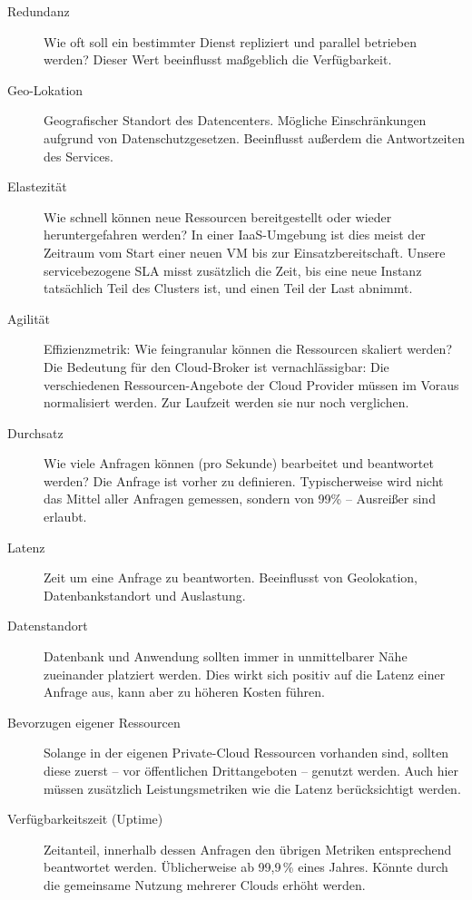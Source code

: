 \begin{description}
	
	\item[Redundanz] Wie oft soll ein bestimmter Dienst repliziert und parallel betrieben werden? Dieser Wert beeinflusst maßgeblich die Verfügbarkeit.	
	
	\item[Geo-Lokation] Geografischer Standort des Datencenters. Mögliche Einschränkungen aufgrund von Datenschutzgesetzen. Beeinflusst außerdem die Antwortzeiten des Services.
	
	\item[Elastezität] Wie schnell können neue Ressourcen bereitgestellt oder wieder heruntergefahren werden? In einer IaaS-Umgebung ist dies meist der Zeitraum vom Start einer neuen VM bis zur Einsatzbereitschaft. Unsere servicebezogene SLA misst zusätzlich die Zeit, bis eine neue Instanz tatsächlich Teil des Clusters ist, und einen Teil der Last abnimmt.
	
	\item[Agilität] Effizienzmetrik: Wie feingranular können die Ressourcen skaliert werden? Die Bedeutung für den Cloud-Broker ist vernachlässigbar: Die verschiedenen Ressourcen-Angebote der Cloud Provider müssen im Voraus normalisiert werden. Zur Laufzeit werden sie nur noch verglichen.
	
	\item[Durchsatz] Wie viele Anfragen können (pro Sekunde) bearbeitet und beantwortet werden? Die Anfrage ist vorher zu definieren. Typischerweise wird nicht das Mittel aller Anfragen gemessen, sondern von 99\% -- Ausreißer sind erlaubt.
	
	\item[Latenz] Zeit um eine Anfrage zu beantworten. Beeinflusst von Geolokation, Datenbankstandort und Auslastung.
	
	\item[Datenstandort] Datenbank und Anwendung sollten immer in unmittelbarer Nähe zueinander platziert werden. Dies wirkt sich positiv auf die Latenz einer Anfrage aus, kann aber zu höheren Kosten führen.
	
	\item[Bevorzugen eigener Ressourcen] Solange in der eigenen Private-Cloud Ressourcen vorhanden sind, sollten diese zuerst -- vor öffentlichen Drittangeboten -- genutzt werden. Auch hier müssen zusätzlich Leistungsmetriken wie die Latenz berücksichtigt werden.
	
	\item[Verfügbarkeitszeit (Uptime)] Zeitanteil, innerhalb dessen Anfragen den übrigen Metriken entsprechend beantwortet werden. Üblicherweise ab 99,9\,\% eines Jahres. Könnte durch die gemeinsame Nutzung mehrerer Clouds erhöht werden.
	

\end{description}
